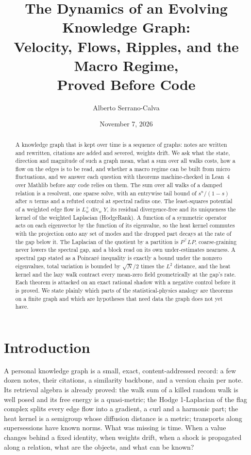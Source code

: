 \documentclass[11pt,a4paper]{article}
\title{The Dynamics of an Evolving Knowledge Graph:\\
Velocity, Flows, Ripples, and the Macro Regime,\\
Proved Before Code}
\author{Alberto Serrano-Calva}
\date{November 7, 2026}
\theoremstyle{plain}
\theoremstyle{definition}
\theoremstyle{remark}
\DeclareMathOperator{\divw}{div}
\begin{document}
\maketitle

\begin{abstract}
A knowledge graph that is kept over time is a sequence of graphs: notes are written and
rewritten, citations are added and severed, weights drift. We ask what the state, direction and
magnitude of such a graph mean, what a sum over all walks costs, how a flow on the edges is to be
read, and whether a macro regime can be built from micro fluctuations, and we answer each question
with theorems machine-checked in Lean~4 over Mathlib before any code relies on them. The sum over
all walks of a damped relation is a resolvent, one sparse solve, with an entrywise tail bound of
$s^n/(1-s)$ after $n$ terms and a refuted control at spectral radius one. The least-squares
potential of a weighted edge flow is $L_w^{+}\divw_w Y$, its residual divergence-free and its
uniqueness the kernel of the weighted Laplacian (HodgeRank). A function of a symmetric operator
acts on each eigenvector by the function of its eigenvalue, so the heat kernel commutes with the
projection onto any set of modes and the dropped part decays at the rate of the gap below it. The
Laplacian of the quotient by a partition is $P^{\top} L P$, coarse-graining never lowers the
spectral gap, and a block read on its own under-estimates nearness. A spectral gap stated as a
Poincar\'e inequality is exactly a bound under the nonzero eigenvalues, total variation is bounded
by $\sqrt{N}/2$ times the $L^2$ distance, and the heat kernel and the lazy walk contract every
mean-zero field geometrically at the gap's rate. Each theorem is attacked on an exact rational
shadow with a negative control before it is proved. We state plainly which parts of the
statistical-physics analogy are theorems on a finite graph and which are hypotheses that need
data the graph does not yet have.
\end{abstract}

\section{Introduction}

A personal knowledge graph is a small, exact, content-addressed record: a few dozen notes, their
citations, a similarity backbone, and a version chain per note. Its retrieval algebra is already
proved: the walk sum of a killed random walk is well posed and its free energy is a quasi-metric;
the Hodge 1-Laplacian of the flag complex splits every edge flow into a gradient, a curl and a
harmonic part; the heat kernel is a semigroup whose diffusion distance is a metric; transports
along supersessions have known norms. What was missing is time. When a value changes behind a
fixed identity, when weights drift, when a shock is propagated along a relation, what are the
objects, and what can be known?
\end{document}
